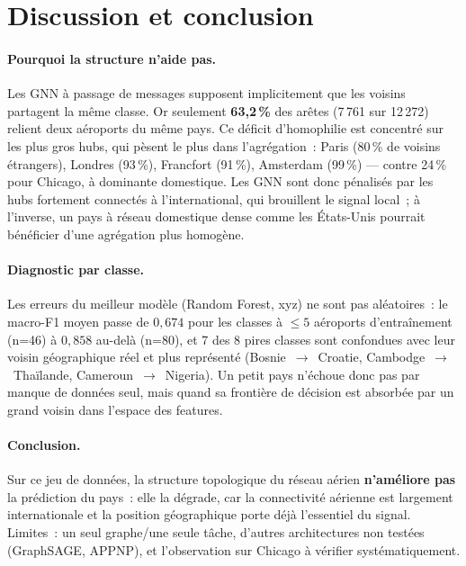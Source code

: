 \documentclass[french]{llncs}
\begin{document}
    \section{Discussion et conclusion} \label{sect:discussion}

    \paragraph{Pourquoi la structure n'aide pas.} Les GNN à passage de messages supposent
    implicitement que les voisins partagent la même classe. Or seulement \textbf{63,2\,\%} des
    arêtes (7\,761 sur 12\,272) relient deux aéroports du même pays. Ce déficit d'homophilie est
    concentré sur les plus gros hubs, qui pèsent le plus dans l'agrégation~: Paris (80\,\% de
    voisins étrangers), Londres (93\,\%), Francfort (91\,\%), Amsterdam (99\,\%) — contre 24\,\%
    pour Chicago, à dominante domestique. Les GNN sont donc pénalisés par les hubs fortement
    connectés à l'international, qui brouillent le signal local~; à l'inverse, un pays à réseau
    domestique dense comme les États-Unis pourrait bénéficier d'une agrégation plus homogène.

    \paragraph{Diagnostic par classe.} Les erreurs du meilleur modèle (Random Forest, xyz) ne sont
    pas aléatoires~: le macro-F1 moyen passe de $0,674$ pour les classes à $\leq 5$ aéroports
    d'entraînement (n=46) à $0,858$ au-delà (n=80), et 7 des 8 pires classes sont confondues avec
    leur voisin géographique réel et plus représenté (Bosnie~$\rightarrow$~Croatie,
    Cambodge~$\rightarrow$~Thaïlande, Cameroun~$\rightarrow$~Nigeria). Un petit pays n'échoue donc
    pas par manque de données seul, mais quand sa frontière de décision est absorbée par un grand
    voisin dans l'espace des features.

    \paragraph{Conclusion.} Sur ce jeu de données, la structure topologique du réseau aérien
    \textbf{n'améliore pas} la prédiction du pays~: elle la dégrade, car la connectivité aérienne
    est largement internationale et la position géographique porte déjà l'essentiel du signal.
    Limites~: un seul graphe/une seule tâche, d'autres architectures non testées (GraphSAGE, APPNP),
    et l'observation sur Chicago à vérifier systématiquement.

    \newpage
    
    
\end{document}
